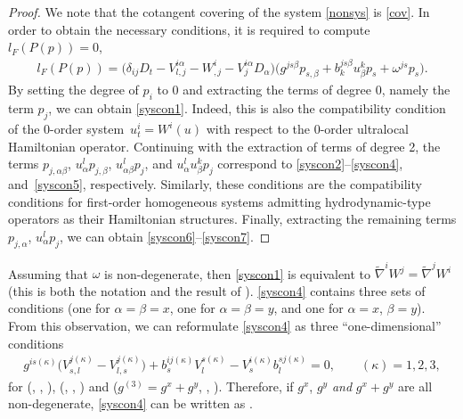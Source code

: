 \documentclass[pdftex]{sigma}
\numberwithin{equation}{section}
\begin{document}
\begin{proof}
We note that the cotangent covering of the system \eqref{nonsys} is \eqref{cov}. In order to obtain the necessary conditions, it is required to compute $l_F(P(p))=0$,
\begin{gather*}
l_F(P(p))=\big(\delta_{ij}D_t-V^{i\alpha}_{l,j}-W^i_{,j}-V^{i\alpha}_jD_\alpha\big)\big(g^{js\beta}p_{s,\beta}+b^{js\beta}_ku^k_\beta p_s+\omega^{js}p_s\big).
\end{gather*}
By setting the degree of $p_i$ to 0 and extracting the terms of degree 0, namely the term $p_j$, we can obtain \eqref{syscon1}. Indeed, this is also the compatibility condition of the 0-order system~${u^i_t=W^i(u)}$ with respect to the 0-order ultralocal Hamiltonian operator. Continuing with the extraction of terms of degree 2, the terms $p_{j,\alpha\beta}$, $u^l_\alpha p_{j,\beta}$, $u^l_{\alpha\beta} p_j$, and $u^l_\alpha u^k_\beta p_j$ correspond to \eqref{syscon2}--\eqref{syscon4}, and~\eqref{syscon5}, respectively. Similarly, these conditions are the compatibility conditions for first-order homogeneous systems admitting hydrodynamic-type operators as their Hamiltonian structures. Finally, extracting the remaining terms $p_{j,\alpha}$, $u^l_\alpha p_j$, we can obtain \eqref{syscon6}--\eqref{syscon7}.
\end{proof}

\begin{Remark}
Assuming that $\omega$ is non-degenerate, then \eqref{syscon1} is equivalent to $\tilde{\nabla}^iW^j=\tilde{\nabla}^jW^i$ (this is both the notation and the result of \cite{vergallo2023non}). \eqref{syscon4} contains three sets of conditions (one for $\alpha=\beta=x$, one for $\alpha=\beta=y$, and one for $\alpha=x$, $\beta=y$). From this observation, we can reformulate \eqref{syscon4} as three ``one-dimensional'' conditions
\begin{gather*}
g^{is(\kappa)}\big(V^{j(\kappa)}_{s,l}-V^{j(\kappa)}_{l,s}\big)+b^{ij(\kappa)}_sV^{s(\kappa)}_l-V^{i(\kappa)}_sb^{sj(\kappa)}_l=0,\qquad(\kappa)=1,2,3,
\end{gather*}
for \big(, , \big), \big(, , \big) and \big($g^{(3)}=g^x+g^y$, , \big). Therefore, if $g^x$, $g^y$ \emph{and} $g^x+g^y$ are all non-degenerate, \eqref{syscon4} can be written as .
\end{Remark}
\end{document}
